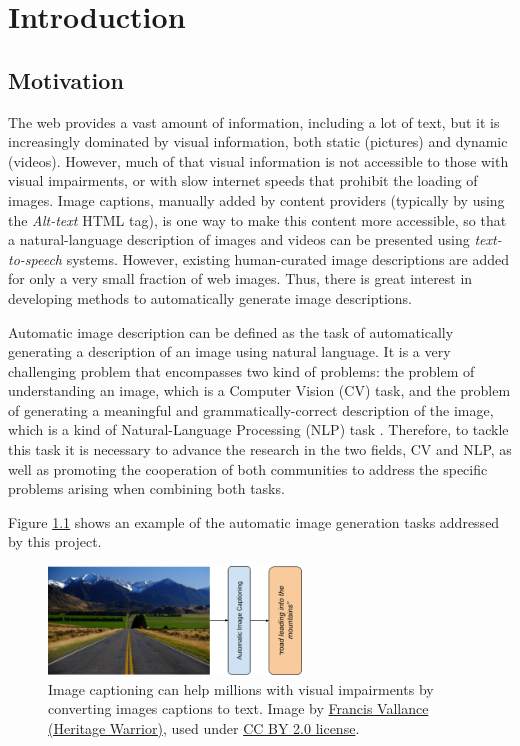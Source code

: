 \chapter{Introduction}
\label{chapter:introduccion}

\section{Motivation}

The web provides a vast amount of information, including a lot of text, but it is increasingly dominated by visual information, both static (pictures) and dynamic (videos).  However, much of that visual information is not accessible to those with visual impairments, or with slow internet speeds that prohibit the loading of images. Image captions, manually added by content providers (typically by using the \textit{ Alt-text} HTML tag), is one way to make this content more accessible, so that a natural-language description of images and videos can be presented using \textit{text-to-speech} systems. However, existing human-curated image descriptions are added for only a very small fraction of web images. Thus, there is great interest in developing methods to automatically generate image descriptions.

Automatic image description can be defined as the task of automatically generating a description of an image using natural language. It is a very challenging problem that encompasses two kind of problems: the problem of understanding an image, which is a Computer Vision (CV) task, and the problem of generating a meaningful and grammatically-correct description of the image, which is a kind of Natural-Language Processing (NLP) task . Therefore, to tackle this task it is necessary to advance the research in the two fields, CV and NLP, as well as promoting the cooperation of both communities to address the specific problems arising when combining both tasks.

Figure \ref{fig:image-captioning} shows an example of the automatic image generation tasks addressed by this project.

\begin{figure}
	\centering
	\includegraphics[width=0.6\textwidth]{figs/ch1/image-captioning.png}
	\caption{Image captioning can help millions with visual impairments by converting images captions to text. Image by \href{https://www.flickr.com/photos/francisvallance/}{Francis Vallance (Heritage Warrior)}, used under \href{https://creativecommons.org/licenses/by/2.0/}{CC BY 2.0 license}.}
	\label{fig:image-captioning}
\end{figure}

